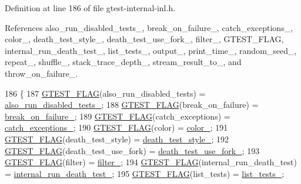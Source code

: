 Definition at line 186 of file gtest-\/internal-\/inl.\+h.



References also\+\_\+run\+\_\+disabled\+\_\+tests\+\_\+, break\+\_\+on\+\_\+failure\+\_\+, catch\+\_\+exceptions\+\_\+, color\+\_\+, death\+\_\+test\+\_\+style\+\_\+, death\+\_\+test\+\_\+use\+\_\+fork\+\_\+, filter\+\_\+, G\+T\+E\+S\+T\+\_\+\+F\+L\+AG, internal\+\_\+run\+\_\+death\+\_\+test\+\_\+, list\+\_\+tests\+\_\+, output\+\_\+, print\+\_\+time\+\_\+, random\+\_\+seed\+\_\+, repeat\+\_\+, shuffle\+\_\+, stack\+\_\+trace\+\_\+depth\+\_\+, stream\+\_\+result\+\_\+to\+\_\+, and throw\+\_\+on\+\_\+failure\+\_\+.


\begin{DoxyCode}
186                     \{
187     \hyperlink{gtest-port_8h_a828f4e34a1c4b510da50ec1563e3562a}{GTEST\_FLAG}(also\_run\_disabled\_tests) = \hyperlink{classtesting_1_1internal_1_1GTestFlagSaver_ad940f8cb0287f0498abfbb8cd3f63676}{also\_run\_disabled\_tests\_};
188     \hyperlink{gtest-port_8h_a828f4e34a1c4b510da50ec1563e3562a}{GTEST\_FLAG}(break\_on\_failure) = \hyperlink{classtesting_1_1internal_1_1GTestFlagSaver_a63eb38f3e9f048128314129a6eadfbaf}{break\_on\_failure\_};
189     \hyperlink{gtest-port_8h_a828f4e34a1c4b510da50ec1563e3562a}{GTEST\_FLAG}(catch\_exceptions) = \hyperlink{classtesting_1_1internal_1_1GTestFlagSaver_a7ea119ac4f2b4410bb97a85aaa753ff2}{catch\_exceptions\_};
190     \hyperlink{gtest-port_8h_a828f4e34a1c4b510da50ec1563e3562a}{GTEST\_FLAG}(color) = \hyperlink{classtesting_1_1internal_1_1GTestFlagSaver_a0ea1a453d5a44ba56a80b7e9c3ce9097}{color\_};
191     \hyperlink{gtest-port_8h_a828f4e34a1c4b510da50ec1563e3562a}{GTEST\_FLAG}(death\_test\_style) = \hyperlink{classtesting_1_1internal_1_1GTestFlagSaver_aaafc84990f1c135a56f8a1e5009adf7e}{death\_test\_style\_};
192     \hyperlink{gtest-port_8h_a828f4e34a1c4b510da50ec1563e3562a}{GTEST\_FLAG}(death\_test\_use\_fork) = \hyperlink{classtesting_1_1internal_1_1GTestFlagSaver_a9b243970df7a8d33764537f358ebe384}{death\_test\_use\_fork\_};
193     \hyperlink{gtest-port_8h_a828f4e34a1c4b510da50ec1563e3562a}{GTEST\_FLAG}(filter) = \hyperlink{classtesting_1_1internal_1_1GTestFlagSaver_ac4de0e4e127f7b08112dfbd564f24000}{filter\_};
194     \hyperlink{gtest-port_8h_a828f4e34a1c4b510da50ec1563e3562a}{GTEST\_FLAG}(internal\_run\_death\_test) = \hyperlink{classtesting_1_1internal_1_1GTestFlagSaver_ac609bb5e1a2433d5d1bec59305b363b1}{internal\_run\_death\_test\_};
195     \hyperlink{gtest-port_8h_a828f4e34a1c4b510da50ec1563e3562a}{GTEST\_FLAG}(list\_tests) = \hyperlink{classtesting_1_1internal_1_1GTestFlagSaver_ac9cdb0db488527001acc3f34f066cce3}{list\_tests\_};

\end{DoxyCode}
